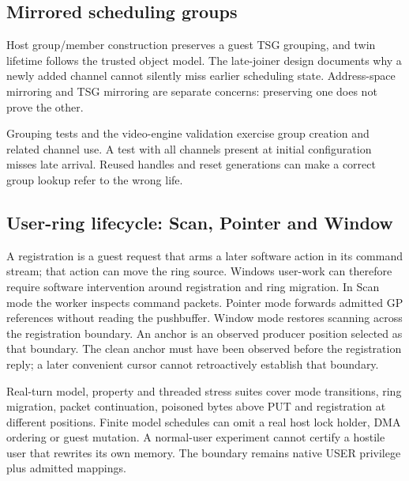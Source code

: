 \subsection{Mirrored scheduling groups}

\readcode Host group/member construction preserves a guest TSG grouping, and twin lifetime follows
the trusted object model.
The late-joiner design documents why a newly added channel cannot silently miss earlier
scheduling state. Address-space mirroring and TSG mirroring are separate concerns: preserving
one does not prove the other.

{Grouping tests and the video-engine validation exercise group creation and related channel
use.}
{A test with all channels present at initial configuration misses late arrival. Reused handles
and reset generations can make a correct group lookup refer to the wrong life.}

\subsection{User-ring lifecycle: Scan, Pointer and Window}

\doc A registration is a guest request that arms a later software action in its
command stream; that action can move the ring source. Windows user-work can therefore require
software intervention around registration and ring
migration. In Scan mode the worker inspects command packets. Pointer mode forwards admitted
GP references without reading the pushbuffer. Window mode restores scanning across the
registration boundary. An anchor is an observed producer position selected as that boundary.
The clean anchor must have been observed before the registration reply;
a later convenient cursor cannot retroactively establish that boundary.

{Real-turn model, property and threaded stress suites cover mode transitions, ring migration,
packet continuation, poisoned bytes above PUT and registration at different positions.
}
{Finite model schedules can omit a real host lock holder, DMA ordering or guest mutation.
A normal-user experiment cannot certify a hostile user that rewrites its own memory.
The boundary remains native USER privilege plus admitted mappings.}


